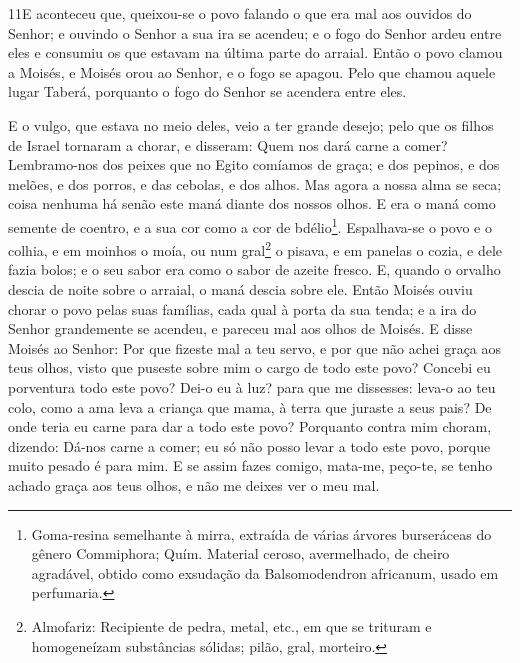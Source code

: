 \medskip

\lettrine{11} E aconteceu que, queixou-se o povo falando o que
era mal aos ouvidos do Senhor; e ouvindo o Senhor a sua ira se
acendeu; e o fogo do Senhor ardeu entre eles e consumiu os que
estavam na última parte do arraial. Então o povo clamou a
Moisés, e Moisés orou ao Senhor, e o fogo se apagou. Pelo que
chamou aquele lugar Taberá, porquanto o fogo do Senhor se acendera
entre eles.

E o vulgo, que estava no meio deles, veio a ter grande desejo;
pelo que os filhos de Israel tornaram a chorar, e disseram: Quem nos
dará carne a comer? Lembramo-nos dos peixes que no Egito
comíamos de graça; e dos pepinos, e dos melões, e dos porros, e das
cebolas, e dos alhos. Mas agora a nossa alma se seca; coisa
nenhuma há senão este maná diante dos nossos olhos. E era o maná
como semente de coentro, e a sua cor como a cor de
bdélio\footnote{Goma-resina semelhante à mirra, extraída de várias
árvores burseráceas do gênero Commiphora; Quím. Material ceroso,
avermelhado, de cheiro agradável, obtido como exsudação da
Balsomodendron africanum, usado em perfumaria.}. Espalhava-se o
povo e o colhia, e em moinhos o moía, ou num
gral\footnote{Almofariz: Recipiente de pedra, metal, etc., em que se
trituram e homogeneízam substâncias sólidas; pilão, gral, morteiro.}
o pisava, e em panelas o cozia, e dele fazia bolos; e o seu sabor
era como o sabor de azeite fresco. E, quando o orvalho descia de
noite sobre o arraial, o maná descia sobre ele. Então Moisés
ouviu chorar o povo pelas suas famílias, cada qual à porta da sua
tenda; e a ira do Senhor grandemente se acendeu, e pareceu mal aos
olhos de Moisés. E disse Moisés ao Senhor: Por que fizeste
mal a teu servo, e por que não achei graça aos teus olhos, visto que
puseste sobre mim o cargo de todo este povo? Concebi eu
porventura todo este povo? Dei-o eu à luz? para que me dissesses:
leva-o ao teu colo, como a ama leva a criança que mama, à terra que
juraste a seus pais? De onde teria eu carne para dar a todo
este povo? Porquanto contra mim choram, dizendo: Dá-nos carne a
comer; eu só não posso levar a todo este povo, porque muito
pesado é para mim. E se assim fazes comigo, mata-me, peço-te,
se tenho achado graça aos teus olhos, e não me deixes ver o meu mal.

